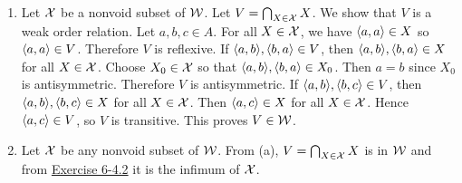 \begin{solution}
\begin{enumerate}[label=(\alph*)]
    \item Let $\mathcal{X}$ be a nonvoid subset of $\mathcal{W}$. Let $V=\bigcap_{X\in\mathcal{X}}X$. We show that $V$
    is a weak order relation. Let $a,b,c\in A$.
    For all $X\in\mathcal{X}$, we have $\left\langle a,a\right\rangle\in X$ so $\left\langle a,a\right\rangle\in V$. Therefore $V$ is reflexive.
    If $\aprn{a,b},\aprn{b,a}\in V$, then $\aprn{a,b},\aprn{b,a}\in X$ for all $X\in\mathcal{X}$. Choose
    $X_0\in\mathcal{X}$ so that $\aprn{a,b},\aprn{b,a}\in X_0$. Then $a=b$ since $X_0$ is antisymmetric.
    Therefore $V$ is antisymmetric.
    If $\aprn{a,b},\aprn{b,c}\in V$, then $\aprn{a,b},\aprn{b,c}\in X$ for all $X\in\mathcal{X}$.
    Then $\left\langle a,c\right\rangle\in X$ for all $X\in\mathcal{X}$. Hence $\left\langle a,c\right\rangle\in V$, so $V$ is transitive.
    This proves $V\in\mathcal{W}$.

    \item Let $\mathcal{X}$ be any nonvoid subset of $\mathcal{W}$. From (a), $V=\bigcap_{X\in\mathcal{X}}X$ is in $\mathcal{W}$
    and from \hyperref[ex:6-4.2]{Exercise 6-4.2} it is the infimum of $\mathcal{X}$.


\end{enumerate}
\end{solution}
